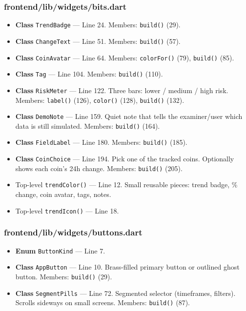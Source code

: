 \subsubsection*{frontend/lib/widgets/bits.dart}
\begin{itemize}[nosep,leftmargin=1.5em]
\item \textbf{Class} \texttt{TrendBadge} --- Line 24. Members: \texttt{build(\allowbreak{})} (29).
\item \textbf{Class} \texttt{ChangeText} --- Line 51. Members: \texttt{build(\allowbreak{})} (57).
\item \textbf{Class} \texttt{CoinAvatar} --- Line 64. Members: \texttt{colorFor(\allowbreak{})} (79), \texttt{build(\allowbreak{})} (85).
\item \textbf{Class} \texttt{Tag} --- Line 104. Members: \texttt{build(\allowbreak{})} (110).
\item \textbf{Class} \texttt{RiskMeter} --- Line 122. Three bars: lower / medium / high risk. Members: \texttt{label(\allowbreak{})} (126), \texttt{color(\allowbreak{})} (128), \texttt{build(\allowbreak{})} (132).
\item \textbf{Class} \texttt{DemoNote} --- Line 159. Quiet note that tells the examiner/user which data is still simulated. Members: \texttt{build(\allowbreak{})} (164).
\item \textbf{Class} \texttt{FieldLabel} --- Line 180. Members: \texttt{build(\allowbreak{})} (185).
\item \textbf{Class} \texttt{CoinChoice} --- Line 194. Pick one of the tracked coins. Optionally shows each coin's 24h change. Members: \texttt{build(\allowbreak{})} (205).
\item Top-level \texttt{trendColor(\allowbreak{})} --- Line 12. Small reusable pieces: trend badge, \% change, coin avatar, tags, notes.
\item Top-level \texttt{trendIcon(\allowbreak{})} --- Line 18.
\end{itemize}
\subsubsection*{frontend/lib/widgets/buttons.dart}
\begin{itemize}[nosep,leftmargin=1.5em]
\item \textbf{Enum} \texttt{ButtonKind} --- Line 7.
\item \textbf{Class} \texttt{AppButton} --- Line 10. Brass-filled primary button or outlined ghost button. Members: \texttt{build(\allowbreak{})} (29).
\item \textbf{Class} \texttt{SegmentPills} --- Line 72. Segmented selector (timeframes, filters). Scrolls sideways on small screens. Members: \texttt{build(\allowbreak{})} (87).
\end{itemize}

